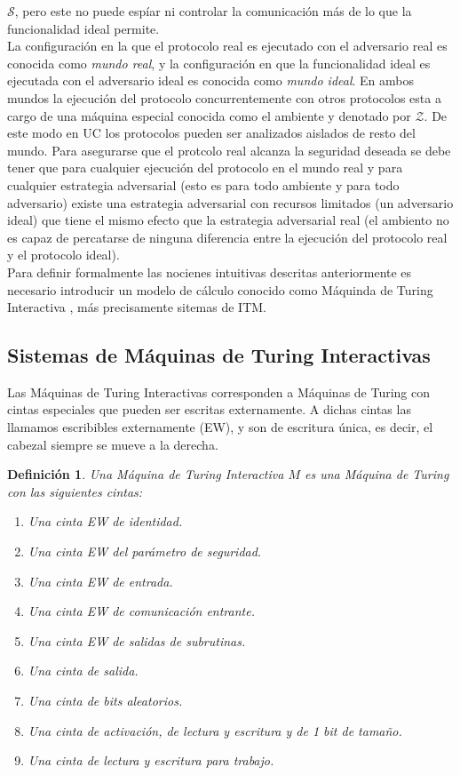 $\mathcal{S}$, pero este no puede espíar ni controlar la comunicación más de lo que la funcionalidad ideal
permite.\\
La configuración en la que el protocolo real es ejecutado con el adversario real es conocida como \textit{mundo
real}, y la configuración en que la funcionalidad ideal es ejecutada con el adversario ideal es conocida como
\textit{mundo ideal}. En ambos mundos la ejecución del protocolo concurrentemente con otros protocolos esta a cargo
de una máquina especial conocida como el ambiente y denotado por $\mathcal{Z}$. De este modo en UC los protocolos
pueden ser analizados aislados de resto del mundo. Para asegurarse que el protcolo real alcanza la seguridad deseada
se debe tener que para cualquier ejecución del protocolo en el mundo real y para cualquier estrategia adversarial
(esto es para todo ambiente y para todo adversario) existe una estrategia adversarial con recursos limitados (un
adversario ideal) que tiene el mismo efecto que la estrategia adversarial real (el ambiento no es capaz de percatarse
de ninguna diferencia entre la ejecución del protocolo real y el protocolo ideal).\\
Para definir formalmente las nocienes intuitivas descritas anteriormente es necesario introducir un modelo de
cálculo conocido como Máquinda de Turing Interactiva , más precisamente sitemas de ITM.

\subsection{Sistemas de Máquinas de Turing Interactivas}

Las Máquinas de Turing Interactivas corresponden a Máquinas de Turing con cintas especiales que pueden ser
escritas externamente. A dichas cintas las llamamos escribibles externamente (EW), y son de escritura única,
es decir, el cabezal siempre se mueve a la derecha.

\newtheorem{definicion}{Definición}

\begin{definicion}
Una Máquina de Turing Interactiva $M$ es una Máquina de Turing con las siguientes cintas:
\begin{enumerate}
    \item Una cinta EW de identidad.
    \item Una cinta EW del parámetro de seguridad.
    \item Una cinta EW de entrada.
    \item Una cinta EW de comunicación entrante.
    \item Una cinta EW de salidas de subrutinas.
    \item Una cinta de salida.
    \item Una cinta de bits aleatorios.
    \item Una cinta de activación, de lectura y escritura y de 1 bit de tamaño.
    \item Una cinta de lectura y escritura para trabajo. 
\end{enumerate}
\end{definicion}

